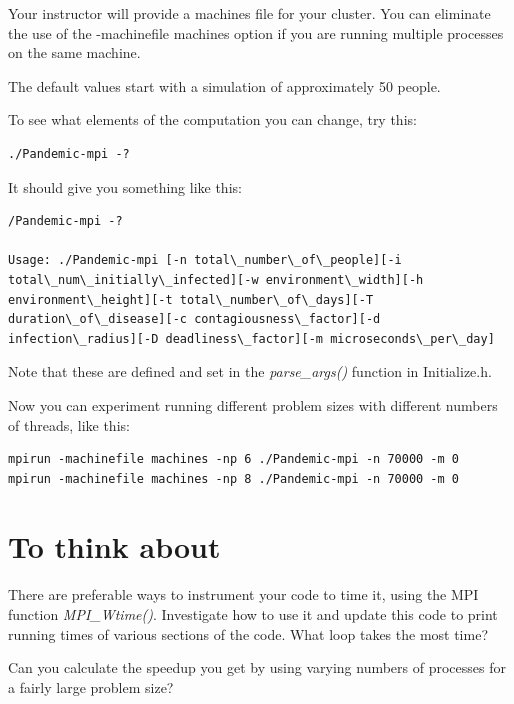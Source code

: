 \documentclass[letterpaper,10pt,openany,oneside]{sphinxmanual}
\begin{document}
Your instructor will provide a machines file for your cluster. You can eliminate the use of the
-machinefile machines option if you are running multiple processes on the same machine.

The default values start with a simulation of approximately 50 people.

To see what elements of the computation you can change, try this:

\begin{Verbatim}[commandchars=\\\{\}]
./Pandemic-mpi -?
\end{Verbatim}

It should give you something like this:

\begin{Verbatim}[commandchars=\\\{\}]
/Pandemic-mpi -?

Usage: ./Pandemic-mpi [-n total\_number\_of\_people][-i total\_num\_initially\_infected][-w environment\_width][-h environment\_height][-t total\_number\_of\_days][-T duration\_of\_disease][-c contagiousness\_factor][-d infection\_radius][-D deadliness\_factor][-m microseconds\_per\_day]
\end{Verbatim}

Note that these are defined and set in the \emph{parse\_args()} function in Initialize.h.

Now you can experiment running different problem sizes with different numbers of threads, like this:

\begin{Verbatim}[commandchars=\\\{\}]
mpirun -machinefile machines -np 6 ./Pandemic-mpi -n 70000 -m 0
mpirun -machinefile machines -np 8 ./Pandemic-mpi -n 70000 -m 0
\end{Verbatim}


\section{To think about}
\label{7.1-BuildAndRun/mpi_build:to-think-about}
There are preferable ways to instrument your code to time it, using the MPI function \emph{MPI\_Wtime()}.  Investigate how to use it and update this code to print running times of various sections of the code.  What loop takes the most time?

Can you calculate the speedup you get by using varying numbers of processes for a fairly large problem size?
\end{document}
